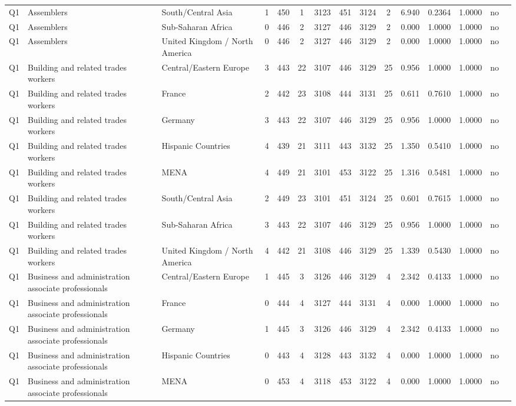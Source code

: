 \begin{longtable}{lllrcccccccccll}
Q1 & Assemblers & South/Central Asia & 1 & 450 & 1 & 3123 & 451 & 3124 & 2 & 6.940 & 0.2364 & 1.0000 & no \\
Q1 & Assemblers & Sub-Saharan Africa & 0 & 446 & 2 & 3127 & 446 & 3129 & 2 & 0.000 & 1.0000 & 1.0000 & no \\
Q1 & Assemblers & United Kingdom / North America & 0 & 446 & 2 & 3127 & 446 & 3129 & 2 & 0.000 & 1.0000 & 1.0000 & no \\
Q1 & Building and related trades workers & Central/Eastern Europe & 3 & 443 & 22 & 3107 & 446 & 3129 & 25 & 0.956 & 1.0000 & 1.0000 & no \\
Q1 & Building and related trades workers & France & 2 & 442 & 23 & 3108 & 444 & 3131 & 25 & 0.611 & 0.7610 & 1.0000 & no \\
Q1 & Building and related trades workers & Germany & 3 & 443 & 22 & 3107 & 446 & 3129 & 25 & 0.956 & 1.0000 & 1.0000 & no \\
Q1 & Building and related trades workers & Hispanic Countries & 4 & 439 & 21 & 3111 & 443 & 3132 & 25 & 1.350 & 0.5410 & 1.0000 & no \\
Q1 & Building and related trades workers & MENA & 4 & 449 & 21 & 3101 & 453 & 3122 & 25 & 1.316 & 0.5481 & 1.0000 & no \\
Q1 & Building and related trades workers & South/Central Asia & 2 & 449 & 23 & 3101 & 451 & 3124 & 25 & 0.601 & 0.7615 & 1.0000 & no \\
Q1 & Building and related trades workers & Sub-Saharan Africa & 3 & 443 & 22 & 3107 & 446 & 3129 & 25 & 0.956 & 1.0000 & 1.0000 & no \\
Q1 & Building and related trades workers & United Kingdom / North America & 4 & 442 & 21 & 3108 & 446 & 3129 & 25 & 1.339 & 0.5430 & 1.0000 & no \\
Q1 & Business and administration associate professionals & Central/Eastern Europe & 1 & 445 & 3 & 3126 & 446 & 3129 & 4 & 2.342 & 0.4133 & 1.0000 & no \\
Q1 & Business and administration associate professionals & France & 0 & 444 & 4 & 3127 & 444 & 3131 & 4 & 0.000 & 1.0000 & 1.0000 & no \\
Q1 & Business and administration associate professionals & Germany & 1 & 445 & 3 & 3126 & 446 & 3129 & 4 & 2.342 & 0.4133 & 1.0000 & no \\
Q1 & Business and administration associate professionals & Hispanic Countries & 0 & 443 & 4 & 3128 & 443 & 3132 & 4 & 0.000 & 1.0000 & 1.0000 & no \\
Q1 & Business and administration associate professionals & MENA & 0 & 453 & 4 & 3118 & 453 & 3122 & 4 & 0.000 & 1.0000 & 1.0000 & no \\

\end{longtable}

